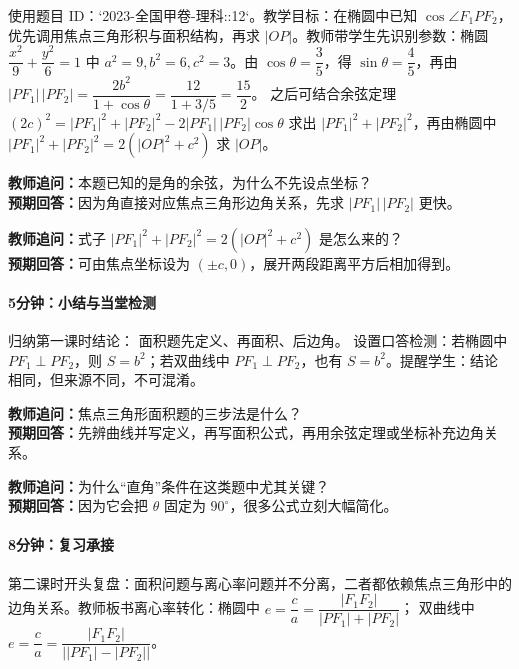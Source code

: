 \documentclass[UTF8,a4paper,11pt]{ctexart}
\begin{document}
使用题目 ID：`2023-全国甲卷-理科::12`。教学目标：在椭圆中已知 $\cos\angle F_1PF_2$，优先调用焦点三角形积与面积结构，再求 $|OP|$。教师带学生先识别参数：椭圆 $\dfrac{x^2}{9}+\dfrac{y^2}{6}=1$ 中 $a^2=9,b^2=6,c^2=3$。由 $\cos\theta=\dfrac35$，得 $\sin\theta=\dfrac45$，再由
$|PF_1|\,|PF_2|=\dfrac{2b^2}{1+\cos\theta}=\dfrac{12}{1+3/5}=\dfrac{15}{2}$。
之后可结合余弦定理
$(2c)^2=|PF_1|^2+|PF_2|^2-2|PF_1|\,|PF_2|\cos\theta$
求出 $|PF_1|^2+|PF_2|^2$，再由椭圆中
$|PF_1|^2+|PF_2|^2=2(|OP|^2+c^2)$
求 $|OP|$。

\noindent\textbf{教师追问：}本题已知的是角的余弦，为什么不先设点坐标？\\

\textbf{预期回答：}因为角直接对应焦点三角形边角关系，先求 $|PF_1|\,|PF_2|$ 更快。\par

\noindent\textbf{教师追问：}式子 $|PF_1|^2+|PF_2|^2=2(|OP|^2+c^2)$ 是怎么来的？\\

\textbf{预期回答：}可由焦点坐标设为 $(\pm c,0)$，展开两段距离平方后相加得到。\par

\paragraph{5分钟：小结与当堂检测}

归纳第一课时结论：
$\boxed{\text{面积题先定义、再面积、后边角}}$。
设置口答检测：若椭圆中 $PF_1\perp PF_2$，则 $S=b^2$；若双曲线中 $PF_1\perp PF_2$，也有 $S=b^2$。提醒学生：结论相同，但来源不同，不可混淆。

\noindent\textbf{教师追问：}焦点三角形面积题的三步法是什么？\\

\textbf{预期回答：}先辨曲线并写定义，再写面积公式，再用余弦定理或坐标补充边角关系。\par

\noindent\textbf{教师追问：}为什么“直角”条件在这类题中尤其关键？\\

\textbf{预期回答：}因为它会把 $\theta$ 固定为 $90^\circ$，很多公式立刻大幅简化。\par

\paragraph{8分钟：复习承接}

第二课时开头复盘：面积问题与离心率问题并不分离，二者都依赖焦点三角形中的边角关系。教师板书离心率转化：椭圆中
$e=\dfrac{c}{a}=\dfrac{|F_1F_2|}{|PF_1|+|PF_2|}$；
双曲线中
$e=\dfrac{c}{a}=\dfrac{|F_1F_2|}{\bigl||PF_1|-|PF_2|\bigr|}$。
\end{document}
